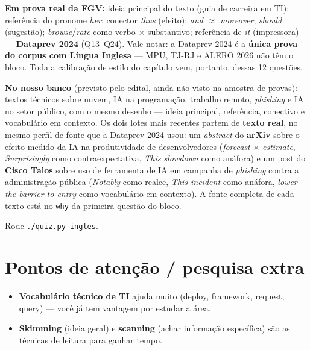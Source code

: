 \begin{jacaiu}
\textbf{Em prova real da FGV:} ideia principal do texto (guia de carreira em
TI); referência do pronome \textit{her}; conector \textit{thus} (efeito);
\textit{and} $\approx$ \textit{moreover}; \textit{should} (sugestão);
\textit{browse}/\textit{rate} como verbo $\times$ substantivo; referência de
\textit{it} (impressora) --- \textbf{Dataprev 2024} (Q13--Q24). Vale notar:
a Dataprev 2024 é a \textbf{única prova do corpus com Língua Inglesa} --- MPU,
TJ-RJ e ALERO 2026 não têm o bloco. Toda a calibração de estilo do capítulo
vem, portanto, dessas 12 questões.

\textbf{No nosso banco} (previsto pelo edital, ainda não visto na amostra de
provas): textos técnicos sobre nuvem, IA na programação, trabalho remoto,
\emph{phishing} e IA no setor público, com o mesmo desenho --- ideia
principal, referência, conectivo e vocabulário em contexto. Os dois lotes
mais recentes partem de \textbf{texto real}, no mesmo perfil de fonte que a
Dataprev 2024 usou: um \emph{abstract} do \textbf{arXiv} sobre o efeito medido
da IA na produtividade de desenvolvedores (\emph{forecast} $\times$
\emph{estimate}, \emph{Surprisingly} como contraexpectativa, \emph{This
slowdown} como anáfora) e um post do \textbf{Cisco Talos} sobre uso de
ferramenta de IA em campanha de \emph{phishing} contra a administração
pública (\emph{Notably} como realce, \emph{This incident} como anáfora,
\emph{lower the barrier to entry} como vocabulário em contexto). A fonte
completa de cada texto está no \texttt{why} da primeira questão do bloco.

Rode \texttt{./quiz.py ingles}.
\end{jacaiu}

\section{Pontos de atenção / pesquisa extra}

\begin{itemize}
\item \textbf{Vocabulário técnico de TI} ajuda muito (deploy, framework,
request, query) --- você já tem vantagem por estudar a área.
\item \textbf{Skimming} (ideia geral) e \textbf{scanning} (achar informação
específica) são as técnicas de leitura para ganhar tempo.
\end{itemize}
